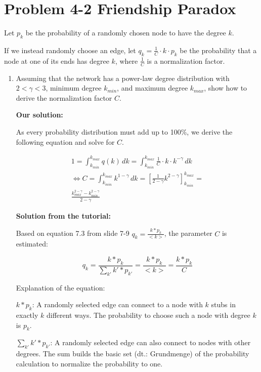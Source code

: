 \section{Problem 4-2 Friendship Paradox}

Let $p_k$ be the probability of a randomly chosen node to have the degree $k$.

If we instead randomly choose an edge, let $q_k = \frac{1}{C} \cdot k \cdot p_k$ be the probability that a node at one of its ends has degree $k$, where $\frac{1}{C}$ is a normalization factor.

\begin{enumerate}
	\item Assuming that the network has a power-law degree distribution with $2 < \gamma
< 3$, minimum degree $k_{min}$, and maximum degree $k_{max}$, show how to derive the normalization factor $C$.

	\textbf{Our solution:}
	
	As every probability distribution must add up to 100\%, we derive the following equation and solve for $C$.

	\begin{equation}
		\begin{split}
		1 = \int_{k_{min}}^{k_{max}} q(k) \, dk = \int_{k_{min}}^{k_{max}} \frac{1}{C} \cdot k \cdot k^{-\gamma} \, dk \\
		\Leftrightarrow C = \int_{k_{min}}^{k_{max}} k^{1-\gamma} \, dk = [\frac{1}{2-\gamma} k^{2-\gamma}]_{k_{min}}^{k_{max}} = \\
		\frac{k_{max}^{2-\gamma} - k_{min}^{2-\gamma}}{2-\gamma}
		\end{split}
	\end{equation}
	
	\textbf{Solution from the tutorial:}
	
	Based on equation 7.3 from slide 7-9 $q_k = \frac{k * p_k}{<k>} $, the parameter $C$ is estimated:
	
	\begin{equation}
	q_k = \frac{k * p_k}{\sum_{k'}^{} k' * p_{k'}} = \frac{k * p_k}{<k>} = \frac{k * p_k}{C}
	\end{equation}
	
	Explanation of the equation:
	
	$k * p_k$: A randomly selected edge can connect to a node with $k$ stubs in exactly $k$ different ways. The probability to choose such a node with degree $k$ is $p_k$.
	
	$\sum_{k'}^{} k' * p_{k'}$: A randomly selected edge can also connect to nodes with other degrees. The sum builds the basic set (dt.: Grundmenge) of the probability calculation to normalize the probability to one.
	

\end{enumerate}
